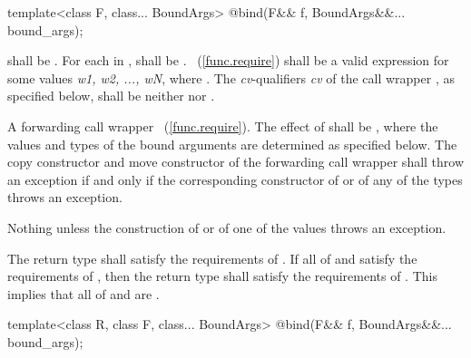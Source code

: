 \begin{itemdecl}
template<class F, class... BoundArgs>
  @\unspec@ bind(F&& f, BoundArgs&&... bound_args);
\end{itemdecl}

\begin{itemdescr}
\pnum
\requires
{} shall be . For each 
in ,  shall be .
~(\ref{func.require}) shall be a valid expression for some
values \textit{w1, w2, ..., wN}, where
.
The \textit{cv}-qualifiers \textit{cv} of the call wrapper ,
as specified below, shall be neither  nor .

\pnum\returns
A forwarding call wrapper ~(\ref{func.require}).
The effect of  shall
be ,
where the values and types of the bound
arguments  are determined as specified below.
The copy constructor and move constructor of the forwarding call wrapper shall throw an
exception if and only if the corresponding constructor of  or of any of the types
 throws an exception.

\pnum
\throws Nothing unless the construction of
 or of one of the values  throws an exception.

\pnum
\remarks The return type shall satisfy the requirements of . If all
of  and  satisfy the requirements of , then the
return type shall satisfy the requirements of . \enternote This implies
that all of  and  are . \exitnote
\end{itemdescr}

\begin{itemdecl}
template<class R, class F, class... BoundArgs>
  @\unspec@ bind(F&& f, BoundArgs&&... bound_args);
\end{itemdecl}

